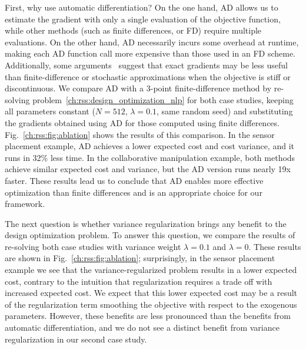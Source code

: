 First, why use automatic differentiation? On the one hand, AD allows us to estimate the gradient with only a single evaluation of the objective function, while other methods (such as finite differences, or FD) require multiple evaluations. On the other hand, AD necessarily incurs some overhead at runtime, making each AD function call more expensive than those used in an FD scheme. Additionally, some arguments~\cite{suh2021_bundled_gradients} suggest that exact gradients may be less useful than finite-difference or stochastic approximations when the objective is stiff or discontinuous. We compare AD with a 3-point finite-difference method by re-solving problem~\eqref{ch:rss:design_optimization_nlp} for both case studies, keeping all parameters constant ($N=512$, $\lambda=0.1$, same random seed) and substituting the gradients obtained using AD for those computed using finite differences. Fig.~\ref{ch:rss:fig:ablation} shows the results of this comparison. In the sensor placement example, AD achieves a lower expected cost and cost variance, and it runs in 32\% less time. In the collaborative manipulation example, both methods achieve similar expected cost and variance, but the AD version runs nearly 19x faster. These results lead us to conclude that AD enables more effective optimization than finite differences and is an appropriate choice for our framework.

The next question is whether variance regularization brings any benefit to the design optimization problem. To answer this question, we compare the results of re-solving both case studies with variance weight $\lambda = 0.1$ and $\lambda = 0$. These results are shown in Fig.~\ref{ch:rss:fig:ablation}; surprisingly, in the sensor placement example we see that the variance-regularized problem results in a lower expected cost, contrary to the intuition that regularization requires a trade off with increased expected cost. We expect that this lower expected cost may be a result of the regularization term smoothing the objective with respect to the exogenous parameters. However, these benefits are less pronounced than the benefits from automatic differentiation, and we do not see a distinct benefit from variance regularization in our second case study.


